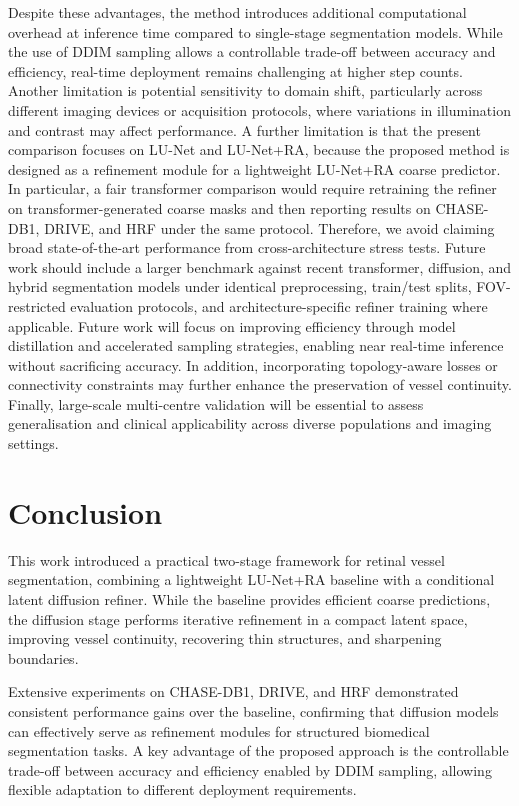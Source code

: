 \documentclass[journal,article,submit,pdftex,moreauthors]{Definitions/mdpi}
\begin{document}
Despite these advantages, the method introduces additional computational overhead at inference time compared to single-stage segmentation models. While the use of DDIM sampling allows a controllable trade-off between accuracy and efficiency, real-time deployment remains challenging at higher step counts. Another limitation is potential sensitivity to domain shift, particularly across different imaging devices or acquisition protocols, where variations in illumination and contrast may affect performance.
A further limitation is that the present comparison focuses on LU-Net and LU-Net+RA, because the proposed method is designed as a refinement module for a lightweight LU-Net+RA coarse predictor. In particular, a fair transformer comparison would require retraining the refiner on transformer-generated coarse masks and then reporting results on CHASE-DB1, DRIVE, and HRF under the same protocol. Therefore, we avoid claiming broad state-of-the-art performance from cross-architecture stress tests. Future work should include a larger benchmark against recent transformer, diffusion, and hybrid segmentation models under identical preprocessing, train/test splits, FOV-restricted evaluation protocols, and architecture-specific refiner training where applicable.
Future work will focus on improving efficiency through model distillation and accelerated sampling strategies, enabling near real-time inference without sacrificing accuracy. In addition, incorporating topology-aware losses or connectivity constraints may further enhance the preservation of vessel continuity. Finally, large-scale multi-centre validation will be essential to assess generalisation and clinical applicability across diverse populations and imaging settings.



\section{Conclusion}
\label{sec:conclusion}

This work introduced a practical two-stage framework for retinal vessel segmentation, combining a lightweight LU-Net+RA baseline with a conditional latent diffusion refiner. While the baseline provides efficient coarse predictions, the diffusion stage performs iterative refinement in a compact latent space, improving vessel continuity, recovering thin structures, and sharpening boundaries.

Extensive experiments on CHASE-DB1, DRIVE, and HRF demonstrated consistent performance gains over the baseline, confirming that diffusion models can effectively serve as refinement modules for structured biomedical segmentation tasks. A key advantage of the proposed approach is the controllable trade-off between accuracy and efficiency enabled by DDIM sampling, allowing flexible adaptation to different deployment requirements.
\end{document}
